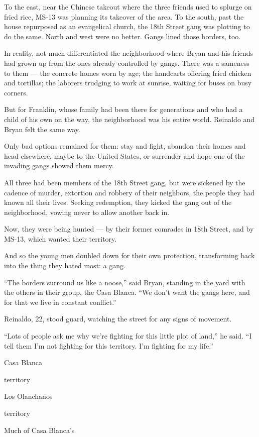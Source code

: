 To the east, near the Chinese takeout where the three friends used to
splurge on fried rice, MS-13 was planning its takeover of the area. To
the south, past the house repurposed as an evangelical church, the 18th
Street gang was plotting to do the same. North and west were no better.
Gangs lined those borders, too.

In reality, not much differentiated the neighborhood where Bryan and his
friends had grown up from the ones already controlled by gangs. There
was a sameness to them --- the concrete homes worn by age; the handcarts
offering fried chicken and tortillas; the laborers trudging to work at
sunrise, waiting for buses on busy corners.

But for Franklin, whose family had been there for generations and who
had a child of his own on the way, the neighborhood was his entire
world. Reinaldo and Bryan felt the same way.

Only bad options remained for them: stay and fight, abandon their homes
and head elsewhere, maybe to the United States, or surrender and hope
one of the invading gangs showed them mercy.

All three had been members of the 18th Street gang, but were sickened by
the cadence of murder, extortion and robbery of their neighbors, the
people they had known all their lives. Seeking redemption, they kicked
the gang out of the neighborhood, vowing never to allow another back in.

Now, they were being hunted --- by their former comrades in 18th Street,
and by MS-13, which wanted their territory.

And so the young men doubled down for their own protection, transforming
back into the thing they hated most: a gang.

``The borders surround us like a noose,'' said Bryan, standing in the
yard with the others in their group, the Casa Blanca. ``We don't want
the gangs here, and for that we live in constant conflict.''

Reinaldo, 22, stood guard, watching the street for any signs of
movement.

``Lots of people ask me why we're fighting for this little plot of
land,'' he said. ``I tell them I'm not fighting for this territory. I'm
fighting for my life.''

Casa Blanca

territory

Los Olanchanos

territory

Much of Casa Blanca's


